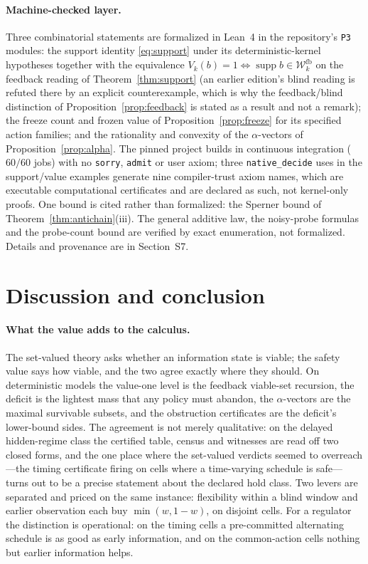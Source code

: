 \documentclass[11pt,a4paper]{article}
\theoremstyle{plain}
\theoremstyle{definition}
\theoremstyle{remark}
\newcommand{\calW}{\mathcal{W}}
\newcommand{\Wfb}{\calW^{\mathrm{fb}}}
\newcommand{\supp}{\operatorname{supp}}
\begin{document}
\paragraph{Machine-checked layer.}
Three combinatorial statements are formalized in Lean~4 \cite{deMouraUllrich2021} in the repository's \texttt{P3} modules: the support identity \eqref{eq:support} under its deterministic-kernel hypotheses together with the equivalence $V_k(b)=1\iff\supp b\in\Wfb_k$ on the feedback reading of Theorem~\ref{thm:support} (an earlier edition's blind reading is refuted there by an explicit counterexample, which is why the feedback/blind distinction of Proposition~\ref{prop:feedback} is stated as a result and not a remark); the freeze count and frozen value of Proposition~\ref{prop:freeze} for its specified action families; and the rationality and convexity of the $\alpha$-vectors of Proposition~\ref{prop:alpha}. The pinned project builds in continuous integration ($60/60$ jobs) with no \texttt{sorry}, \texttt{admit} or user axiom; three \texttt{native\_decide} uses in the support/value examples generate nine compiler-trust axiom names, which are executable computational certificates and are declared as such, not kernel-only proofs. One bound is cited rather than formalized: the Sperner bound of Theorem~\ref{thm:antichain}(iii). The general additive law, the noisy-probe formulas and the probe-count bound are verified by exact enumeration, not formalized. Details and provenance are in Section~S7.
\section{Discussion and conclusion}\label{sec:discussion}

\paragraph{What the value adds to the calculus.}
The set-valued theory asks whether an information state is viable; the safety value says how viable, and the two agree exactly where they should. On deterministic models the value-one level is the feedback viable-set recursion, the deficit is the lightest mass that any policy must abandon, the $\alpha$-vectors are the maximal survivable subsets, and the obstruction certificates are the deficit's lower-bound sides. The agreement is not merely qualitative: on the delayed hidden-regime class the certified table, census and witnesses are read off two closed forms, and the one place where the set-valued verdicts seemed to overreach---the timing certificate firing on cells where a time-varying schedule is safe---turns out to be a precise statement about the declared hold class. Two levers are separated and priced on the same instance: flexibility within a blind window and earlier observation each buy $\min(w,1-w)$, on disjoint cells. For a regulator the distinction is operational: on the timing cells a pre-committed alternating schedule is as good as early information, and on the common-action cells nothing but earlier information helps.
\end{document}
